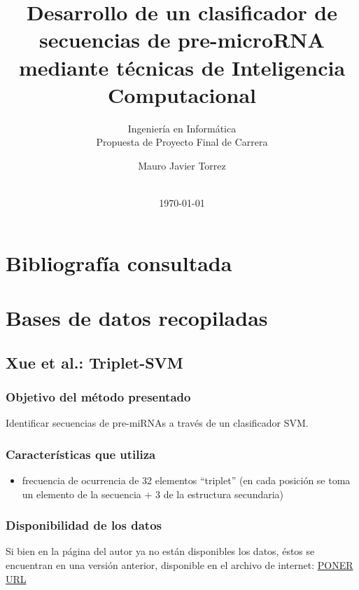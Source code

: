 \documentclass[12pt,bibliography=openstyle,DIV=12,parskip=half-]{scrartcl}
\begin{document}
%
\begin{titlepage}
%
\titlehead{\center Universidad Nacional del Litoral\\
  Facultad de Ingeniería y Ciencias Hídricas}
%
\subtitle{Ingeniería en Informática\\
  Propuesta de Proyecto Final de Carrera}
%
\title{Desarrollo de un clasificador de secuencias de pre-microRNA
  mediante técnicas de Inteligencia Computacional}
\subject{Informe entregable 1}
\author{Mauro Javier Torrez}
%
\publishers{\-\\[4em]{Director\\Dr. Diego H. Milone}\\[2em]
  {Asesora temática\\Dra. Georgina S. Stegmayer}}
%
\date{\-\\[2em]\today}
%
\renewcommand*{\titlepagestyle}{empty}
\maketitle
\end{titlepage}
\setcounter{page}{1}
%
%
%
%
\section{Bibliografía consultada}
\section{Bases de datos recopiladas}
\subsection{Xue et al.: Triplet-SVM}
\subsubsection{Objetivo del método presentado}
Identificar secuencias de pre-miRNAs a través de un clasificador SVM.
\subsubsection{Características que utiliza}
\begin{itemize}
\item frecuencia de ocurrencia de 32 elementos ``triplet'' (en cada
  posición se toma un elemento de la secuencia + 3 de la estructura
  secundaria)
\end{itemize}
\subsubsection{Disponibilidad de los datos}
Si bien en la página del autor ya no están disponibles los datos,
éstos se encuentran en una versión anterior, disponible en el archivo
de internet: \url{PONER URL}
\end{document}
